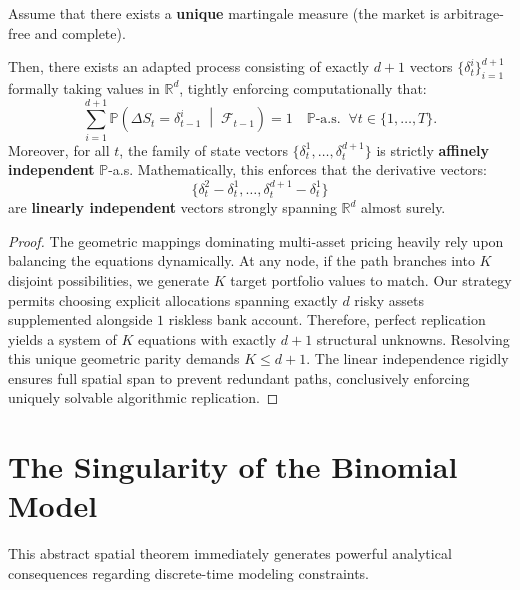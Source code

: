\begin{proposition}
    Assume that there exists a \textbf{unique} martingale measure (the market is arbitrage-free and complete). 
    
    Then, there exists an adapted process consisting of exactly $d+1$ vectors $\{\delta_{t}^i\}_{i=1}^{d+1}$ formally taking values in $\mathbb{R}^d$, tightly enforcing computationally that:
    \begin{equation} \label{eq:branching_condition}
        \sum_{i=1}^{d+1} \mathbb{P}\left(\Delta S_t = \delta_{t-1}^i \;\middle|\; \mathcal{F}_{t-1}\right) = 1 \quad \mathbb{P}\text{-a.s.} \;\; \forall t \in \{1, \dots, T\}.
    \end{equation}
    Moreover, for all $t$, the family of state vectors $\{\delta_t^1, \dots, \delta_t^{d+1}\}$ is strictly \textbf{affinely independent} $\mathbb{P}$-a.s. Mathematically, this enforces that the derivative vectors:
    \begin{equation}
        \{ \delta_t^2 - \delta_t^1, \dots, \delta_t^{d+1} - \delta_t^1 \}
    \end{equation}
    are \textbf{linearly independent} vectors strongly spanning $\mathbb{R}^d$ almost surely.
\end{proposition}

\begin{proof}
    The geometric mappings dominating multi-asset pricing heavily rely upon balancing the equations dynamically. At any node, if the path branches into $K$ disjoint possibilities, we generate $K$ target portfolio values to match. Our strategy permits choosing explicit allocations spanning exactly $d$ risky assets supplemented alongside $1$ riskless bank account. 
    Therefore, perfect replication yields a system of $K$ equations with exactly $d+1$ structural unknowns. Resolving this unique geometric parity demands $K \leq d+1$. The linear independence rigidly ensures full spatial span to prevent redundant paths, conclusively enforcing uniquely solvable algorithmic replication.
\end{proof}

\section{The Singularity of the Binomial Model}

This abstract spatial theorem immediately generates powerful analytical consequences regarding discrete-time modeling constraints.

